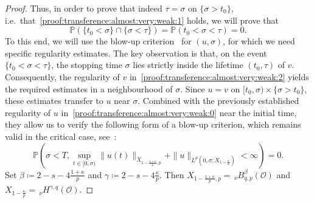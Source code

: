 \documentclass[reqno]{amsart}
\renewcommand{\P}{\mathbb{P}}
\newcommand{\sO}{\mathscr{O}}
\newcommand{\ce}{\coloneqq}
\newcommand{\1}{\mathbf{1}}
\newcommand{\nH}{\ensuremath{\,_\nu H}}
\newcommand{\bpsn}[1]{\ensuremath{\nH^{#1}(\sO)}}
\begin{document}
\begin{proof}
Thus, in order to prove that indeed $\tau =\sigma$ on $\{\sigma>t_0\}$, i.e.\ that~\eqref{proof:transference:almost:very:weak:1} holds, we will prove that $$\P(\{t_0<\sigma\}\cap\{ \sigma<\tau\})=\P(t_0<\sigma<\tau)=0.$$ 
To this end, we will use the blow-up criterion~\cite[Theorem 4.10]{agrestiNonlinearParabolicStochastic2022a} for $(u,\sigma)$, for which we need specific regularity estimates.
The key observation is that, on the event $\{t_0<\sigma<\tau\}$, the stopping time $\sigma$ lies strictly inside the lifetime $(t_0,\tau)$ of $v$. Consequently, the regularity of $v$ in~\eqref{proof:transference:almost:very:weak:2} yields the required estimates in a neighbourhood of $\sigma$. Since $u=v$ on $[t_0,\sigma)\times\{\sigma>t_0\}$, these estimates transfer to $u$ near $\sigma$. Combined with the previously established regularity of $u$ in~\eqref{proof:transference:almost:very:weak:0} near the initial time, they allow us to verify the following form of a blow-up criterion, which remains valid in the critical case, see~\cite[Theorem 4.10]{agrestiNonlinearParabolicStochastic2022a}:
\[\P(\sigma<T, \sup_{t\in [0,\sigma)} \|u(t)\|_{X_{1-\frac{1+\kappa}{p},p}}+ \|u\|_{L^p(0,\sigma; X_{1-\frac{\kappa}{p}})}<\infty)=0.\]
Set $\beta\ce  2-s-4\frac{1+\kappa}{p}$  and $\gamma\ce  2-s-4\frac{\kappa}{p}$. Then $X_{1-\frac{1+\kappa}{p},p}=\,_\nu B^\beta_{q,p}(\sO)$  and $X_{1-\frac{\kappa}{p}}=\bpsn{\gamma,q}$. 


\end{proof}
\end{document}
